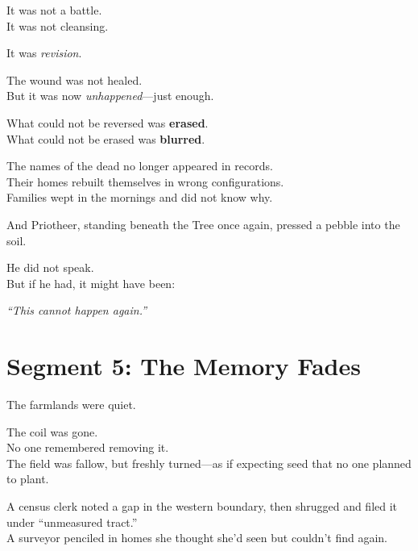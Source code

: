 \documentclass[9pt]{article}
\begin{document}
\vspace{0.5em}
It was not a battle.\\
It was not cleansing.

\vspace{0.5em}
It was \textit{revision}.

\vspace{0.5em}
The wound was not healed.\\
But it was now \textit{unhappened}---just enough.

\vspace{0.5em}
What could not be reversed was \textbf{erased}.\\
What could not be erased was \textbf{blurred}.

\vspace{0.5em}
The names of the dead no longer appeared in records.\\
Their homes rebuilt themselves in wrong configurations.\\
Families wept in the mornings and did not know why.

\vspace{0.5em}
And Priotheer, standing beneath the Tree once again, pressed a pebble into the soil.

\vspace{0.5em}
He did not speak.\\
But if he had, it might have been:

\vspace{0.5em}
\textit{``This cannot happen again.''}


\newpage

\section*{Segment 5: The Memory Fades}

The farmlands were quiet.

\vspace{0.5em}
The coil was gone.\\
No one remembered removing it.\\
The field was fallow, but freshly turned---as if expecting seed that no one planned to plant.

\vspace{0.5em}
A census clerk noted a gap in the western boundary, then shrugged and filed it under ``unmeasured tract.''\\
A surveyor penciled in homes she thought she’d seen but couldn’t find again.
\end{document}
